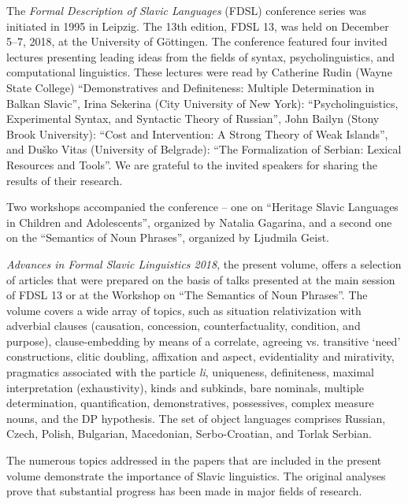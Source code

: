 \documentclass[output=paper,
colorlinks,
citecolor=brown,
newtxmath
]{langscibook}
\begin{document}
\begin{refsection}

The \textit{Formal Description of Slavic Languages} (FDSL) conference series was initiated in 1995 in Leipzig. The 13th edition, FDSL 13, was held on December 5--7, 2018, at the University of Göttingen. The conference featured four invited lectures presenting leading ideas from the fields of syntax, psycholinguistics, and computational linguistics. These lectures were read by Catherine Rudin (Wayne State College) ``Demonstratives and Definiteness: Multiple Determination in Balkan Slavic'', Irina Sekerina (City University of New York): ``Psycholinguistics, Experimental Syntax, and Syntactic Theory of Russian'', John Bailyn (Stony Brook University): ``Cost and Intervention: A Strong Theory of Weak Islands'', and Duško Vitas (University of Belgrade): ``The Formalization of Serbian: Lexical Resources and Tools''. We are grateful to the invited speakers for sharing the results of their research.

Two workshops accompanied the conference -- one on ``Heritage Slavic Languages in Children and Adolescents'', organized by Natalia Gagarina, and a second one on the ``Semantics of Noun Phrases'', organized by Ljudmila Geist.

\textit{Advances in Formal Slavic Linguistics 2018}, the present volume, offers a selection of articles that were prepared on the basis of talks presented at the main session of FDSL 13 or at the Workshop on ``The Semantics of Noun Phrases''. The volume covers a wide array of topics, such as situation relativization with adverbial clauses (causation, concession, counterfactuality, condition, and purpose), clause-embedding by means of a correlate, agreeing vs. transitive `need' constructions, clitic doubling, affixation and aspect, evidentiality and mirativity, pragmatics associated with the particle \textit{li}, uniqueness, definiteness, maximal interpretation (exhaustivity), kinds and subkinds, bare nominals, multiple determination, quantification, demonstratives, possessives, complex measure nouns, and the DP hypothesis. The set of object languages comprises Russian, Czech, Polish, Bulgarian, Macedonian, Serbo-Croatian, and Torlak Serbian.

The numerous topics addressed in the papers that are included in the present volume demonstrate the importance of Slavic linguistics. The original analyses prove that substantial progress has been made in major fields of research.

\largerpage[-1]


\end{refsection}
\end{document}

